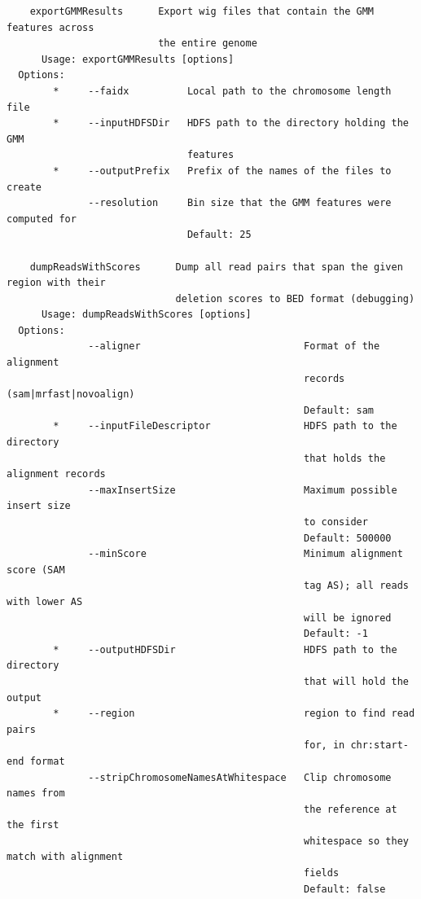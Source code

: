 \documentclass[11pt]{article}
\begin{document}
\begin{verbatim}
    exportGMMResults      Export wig files that contain the GMM features across 
                          the entire genome
      Usage: exportGMMResults [options]
  Options:
        *     --faidx          Local path to the chromosome length file
        *     --inputHDFSDir   HDFS path to the directory holding the GMM
                               features
        *     --outputPrefix   Prefix of the names of the files to create
              --resolution     Bin size that the GMM features were computed for
                               Default: 25

    dumpReadsWithScores      Dump all read pairs that span the given region with their 
                             deletion scores to BED format (debugging)
      Usage: dumpReadsWithScores [options]
  Options:
              --aligner                            Format of the alignment
                                                   records (sam|mrfast|novoalign)
                                                   Default: sam
        *     --inputFileDescriptor                HDFS path to the directory
                                                   that holds the alignment records
              --maxInsertSize                      Maximum possible insert size
                                                   to consider
                                                   Default: 500000
              --minScore                           Minimum alignment score (SAM
                                                   tag AS); all reads with lower AS
                                                   will be ignored
                                                   Default: -1
        *     --outputHDFSDir                      HDFS path to the directory
                                                   that will hold the output
        *     --region                             region to find read pairs
                                                   for, in chr:start-end format
              --stripChromosomeNamesAtWhitespace   Clip chromosome names from
                                                   the reference at the first
                                                   whitespace so they match with alignment
                                                   fields
                                                   Default: false


\end{verbatim}
\end{document}
